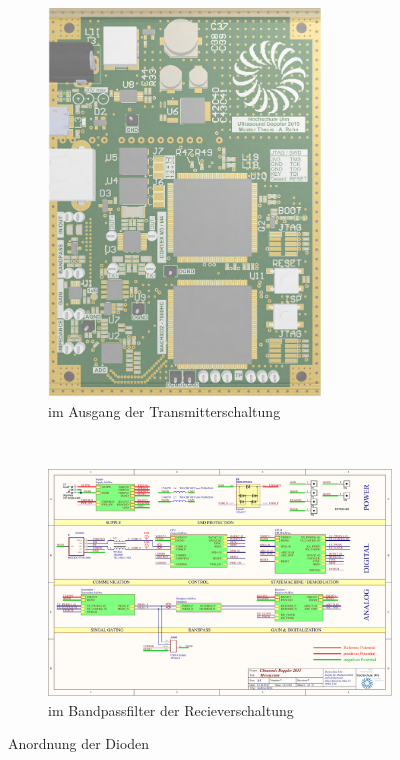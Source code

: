 \begin{figure}[!h]
        \centering
        \begin{subfigure}[b]{0.48\textwidth}
        \centering
                \includegraphics[page=11, width=0.8\textwidth, trim =242mm 80mm 10mm 87mm, clip=true]{images/pcb/docu.pdf}
	    		\caption{im Ausgang der Transmitterschaltung}
	    		\label{fig:dioden_tx}
        \end{subfigure}%
        \hfil
        ~ %
        \begin{subfigure}[b]{0.48\textwidth}
                \includegraphics[page=3, width=\textwidth, trim=50mm 91mm 150mm 59mm, clip=true]{images/pcb/new.pdf}
		    \caption{im Bandpassfilter der Recieverschaltung}
		    \label{fig:dioden_rx}
        \end{subfigure}
        \caption{Anordnung der Dioden}\label{fig:filter_final}
\end{figure}
\newpage
